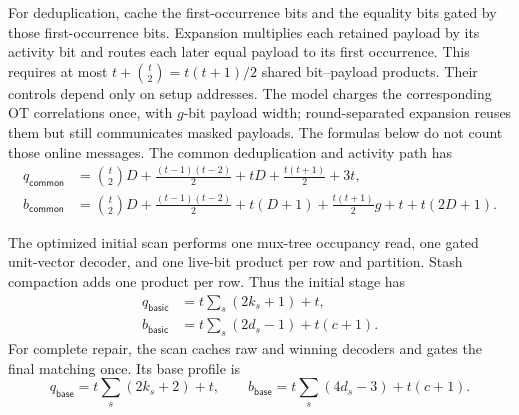 For deduplication, cache the first-occurrence bits and the equality bits
gated by those first-occurrence bits. Expansion multiplies each retained
payload by its activity bit and routes each later equal payload to its first
occurrence. This requires at most $t+\binom t2=t(t+1)/2$ shared
bit--payload products. Their controls depend only on setup addresses.
The model charges the corresponding OT correlations once, with $g$-bit
payload width; round-separated expansion reuses them but still communicates
masked payloads. The formulas below do not count those online messages.
The common deduplication and activity path has
\begin{align}
 q_{\mathsf{common}}
  &=\binom t2D+\frac{(t-1)(t-2)}2+tD
    +\frac{t(t+1)}2+3t,
    \label{eq:waterfall-common-ot-count}\\
 b_{\mathsf{common}}
  &=\binom t2D+\frac{(t-1)(t-2)}2+t(D+1)
    +\frac{t(t+1)}2g+t+t(2D+1).
    \label{eq:waterfall-common-ot-bits}
\end{align}

The optimized initial scan performs one mux-tree occupancy read, one gated
unit-vector decoder, and one live-bit product per row and partition.  Stash
compaction adds one product per row.  Thus the initial stage has
\begin{align}
 q_{\mathsf{basic}}&=t\sum_s(2k_s+1)+t,
 \label{eq:waterfall-basic-ot-count}\\
 b_{\mathsf{basic}}&=t\sum_s(2d_s-1)+t(c+1).
 \label{eq:waterfall-basic-ot-bits}
\end{align}
For complete repair, the scan caches raw and winning decoders and gates the
final matching once.  Its base profile is
\begin{equation}\label{eq:waterfall-bounded-base-cost}
 q_{\mathsf{base}}=t\sum_s(2k_s+2)+t,
 \qquad
 b_{\mathsf{base}}=t\sum_s(4d_s-3)+t(c+1).
\end{equation}

